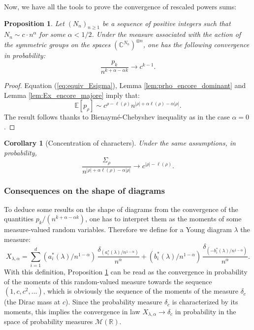 \documentclass[10pt]{amsart}
\newtheorem{proposition}[theorem]{Proposition}
\newtheorem{corollary}[theorem]{Corollary}
\theoremstyle{remark}
\newcommand{\R}{\mathbb{R}}
\newcommand{\C}{\mathbb{C}}
\newcommand{\esper}{\mathbb{E}}
\begin{document}
\noindent Now, we have all the tools to prove the convergence of rescaled powers sums:

\begin{proposition}\label{prop:cv_powersums_encore}
Let $(N_n)_{n \geq 1}$ be a sequence of positive integers such that $N_n \sim c \cdot n^\alpha$ for some $\alpha <1/2$. Under the measure associated with the action of the symmetric groups on the spaces $(\C^{N_n})^{\otimes n}$, one has the following convergence in probability:
$$\frac{p_k}{n^{k + \alpha - \alpha k}} \rightarrow c^{k-1}.$$
\end{proposition}

\begin{proof}
 Equation (\ref{eq:equiv_Esigma}), Lemma \ref{lem:prho_encore_dominant} and Lemma \ref{lem:Ex_encore_majore} imply that:
$$\esper[p_\rho] \sim c^{\rho - \ell(\rho)} n^{|\rho| + \alpha \ell(\rho) -\alpha |\rho|}.$$
The result follows thanks to Bienaym\'e-Chebyshev inequality as in the case $\alpha=0$.
\end{proof}

\begin{corollary}[Concentration of characters]
 Under the same assumptions, in probability,
$$\frac{\varSigma_\rho}{n^{|\rho| + \alpha \ell(\rho) -\alpha |\rho|}} \rightarrow c^{|\rho|-\ell(\rho)}.$$
\end{corollary}\medskip



\subsubsection{Consequences on the shape of diagrams}
To deduce some results on the shape of diagrams from the convergence of the quantities $p_k/(n^{k + \alpha - \alpha k})$, one has to interpret them as the moments of some measure-valued random variables. Therefore we define for a Young diagram $\lambda$ the measure:
$$X_{\lambda,\alpha}=\sum_{i=1}^d (a_i^*(\lambda)/n^{1-\alpha}) \, \frac{\delta_{(a_i^*(\lambda)/n^{1-\alpha})}}{n^\alpha} + (b_i^*(\lambda)/n^{1-\alpha}) \, \frac{\delta_{(-b_i^*(\lambda)/n^{1-\alpha})}}{n^\alpha}.$$
With this definition, Proposition \ref{prop:cv_powersums_encore} can be read as the convergence in probability of the moments of this random-valued measure towards the sequence $(1,c,c^2,\ldots)$, which is obviously the sequence of the moments of the measure $\delta_c$ (the Dirac mass at $c$). Since the probability measure $\delta_{c}$ is characterized by its moments, this implies the convergence in law $X_{\lambda,\alpha} \to \delta_{c}$ in probability in the space of probability measures $\mathscr{M}(\R)$. \bigskip
\end{document}
